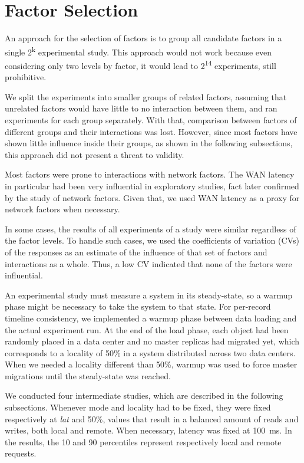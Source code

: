 \documentclass[man,floatsintext,12pt]{apa6}
\begin{document}
\section{Factor Selection}

An approach for the selection of factors is to group all candidate factors in a
single 2\textsuperscript{k} experimental study. This approach would not work
because even considering only two levels by factor, it would lead to
2\textsuperscript{14} experiments, still prohibitive.

We split the experiments into smaller groups of related factors, assuming
that unrelated factors would have little to no interaction between them, and
ran experiments for each group separately. With that, comparison between
factors of different groups and their interactions was lost. However, since
most factors have shown little influence inside their groups, as shown in the
following subsections, this approach did not present a threat to validity.

Most factors were prone to interactions with network factors. The WAN latency
in particular had been very influential in exploratory studies, fact later
confirmed by the study of network factors. Given that, we used WAN latency as a
proxy for network factors when necessary.

In some cases, the results of all experiments of a study were similar
regardless of the factor levels. To handle such cases, we used the coefficients
of variation (CVs) of the responses as an estimate of the influence of that set
of factors and interactions as a whole. Thus, a low CV indicated that none of
the factors were influential.

An experimental study must measure a system in its steady-state, so a warmup
phase might be necessary to take the system to that state. For per-record
timeline consistency, we implemented a warmup phase between data loading and
the actual experiment run. At the end of the load phase, each object had been
randomly placed in a data center and no master replicas had migrated yet, which
corresponds to a locality of 50\% in a system distributed across two data
centers. When we needed a locality different than 50\%, warmup was used to
force master migrations until the steady-state was reached.

We conducted four intermediate studies, which are described in the following
subsections. Whenever mode and locality had to be fixed, they were fixed
respectively at \textit{lat} and 50\%, values that result in a balanced amount
of reads and writes, both local and remote. When necessary, latency was fixed
at 100~ms. In the results, the 10 and 90 percentiles represent respectively
local and remote requests.
\end{document}
